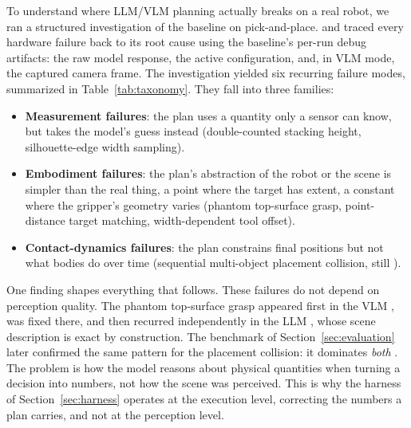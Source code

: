 To understand where LLM/VLM planning actually breaks on a real
robot, we ran a structured investigation of the baseline on
pick-and-place.  and traced every hardware failure back to
its root cause using the baseline's per-run debug artifacts: the raw
model response, the active configuration, and, in VLM mode, the
captured camera frame.
The investigation yielded six recurring failure modes, summarized in
Table~\ref{tab:taxonomy}. They fall into three families:
\begin{itemize}
  \item \textbf{Measurement failures}: the plan uses a quantity
    only a sensor can know, but takes the model's guess instead
    (double-counted stacking height, silhouette-edge width sampling).
  \item \textbf{Embodiment failures}: the plan's abstraction of
    the robot or the scene is simpler than the real thing, a point
    where the target has extent, a constant where the gripper's
    geometry varies (phantom top-surface grasp, point-distance target
    matching, width-dependent tool offset).
  \item \textbf{Contact-dynamics failures}: the plan constrains
    final positions but not what bodies do over time (sequential
    multi-object placement collision, still ).
\end{itemize}

One finding shapes everything that follows. These failures do not
depend on perception quality. The phantom top-surface grasp appeared
first in the VLM , was fixed there, and then
recurred independently in the LLM , whose scene
description is exact by construction. The benchmark of
Section~\ref{sec:evaluation} later confirmed the same pattern for the
placement collision: it dominates \emph{both} .
The problem is how the model reasons about physical quantities when
turning a decision into numbers, not how the scene was perceived. This
is why the harness of Section~\ref{sec:harness} operates at the
execution level, correcting the numbers a plan carries, and not at the
perception level.

